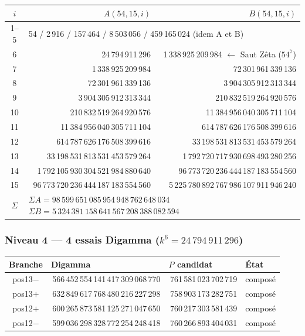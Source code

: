 \documentclass[11pt,a4paper]{article}
\begin{document}
\begin{center}\small
\begin{tabular}{@{}c r r@{}}
\toprule
\rowcolor{spectralgris}
$i$ & $A(54,15,i)$ & $B(54,15,i)$ \\
\midrule
1--5 & \multicolumn{2}{l}{54 / 2\,916 / 157\,464 / 8\,503\,056 / 459\,165\,024 \quad (idem A et B)} \\
6 & 24\,794\,911\,296 & 1\,338\,925\,209\,984 \quad $\leftarrow$ Saut Zêta ($54^{7}$) \\
7 & 1\,338\,925\,209\,984 & 72\,301\,961\,339\,136 \\
8 & 72\,301\,961\,339\,136 & 3\,904\,305\,912\,313\,344 \\
9 & 3\,904\,305\,912\,313\,344 & 210\,832\,519\,264\,920\,576 \\
10 & 210\,832\,519\,264\,920\,576 & 11\,384\,956\,040\,305\,711\,104 \\
11 & 11\,384\,956\,040\,305\,711\,104 & 614\,787\,626\,176\,508\,399\,616 \\
12 & 614\,787\,626\,176\,508\,399\,616 & 33\,198\,531\,813\,531\,453\,579\,264 \\
13 & 33\,198\,531\,813\,531\,453\,579\,264 & 1\,792\,720\,717\,930\,698\,493\,280\,256 \\
14 & 1\,792\,105\,930\,304\,521\,984\,880\,640 & 96\,773\,720\,236\,444\,187\,183\,554\,560 \\
15 & 96\,773\,720\,236\,444\,187\,183\,554\,560 & 5\,225\,780\,892\,767\,986\,107\,911\,946\,240 \\
\midrule
$\Sigma$ & \multicolumn{2}{l}{$\Sigma A = 98\,599\,651\,085\,954\,948\,762\,648\,034$ \quad $\Sigma B = 5\,324\,381\,158\,641\,567\,208\,388\,082\,594$} \\
\bottomrule
\end{tabular}
\end{center}

\subsubsection{Niveau 4 --- 4 essais Digamma ($k^{6} = 24\,794\,911\,296$)}

\begin{center}\small
\begin{tabular}{@{}c >{\raggedleft\arraybackslash}p{5.6cm} >{\raggedleft\arraybackslash}p{4.2cm} l@{}}
\toprule
\rowcolor{spectralgris}
Branche & Digamma & $P$ candidat & État \\
\midrule
pos13$-$ & 98\,566\,452\,554\,141\,417\,309\,068\,770 & 210\,761\,581\,023\,702\,719 & composé \\
pos13$+$ & 98\,632\,849\,617\,768\,480\,216\,227\,298 & 210\,758\,903\,173\,282\,751 & composé \\
pos12$+$ & 98\,600\,265\,873\,581\,125\,271\,047\,650 & 210\,760\,217\,303\,581\,439 & composé \\
pos12$-$ & 98\,599\,036\,298\,328\,772\,254\,248\,418 & 210\,760\,266\,893\,404\,031 & composé \\
\bottomrule
\end{tabular}
\end{center}
\end{document}
